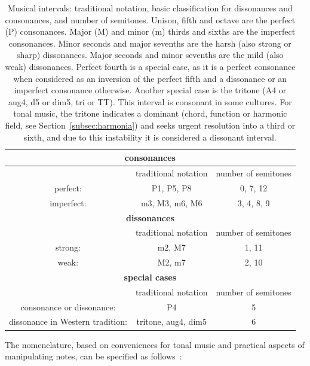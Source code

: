 \documentclass[format=acmsmall, review=false, screen=true]{acmart}
\begin{document}
\begin{table}[htp!]
\centering
    \caption{Musical intervals: traditional notation, basic classification for dissonances and consonances, and number of semitones. Unison, fifth and octave are the perfect (P) consonances. Major (M) and minor (m) thirds and sixths are the imperfect consonances. Minor seconds and major sevenths are the harsh (also strong or sharp) dissonances. Major seconds and minor sevenths are the mild (also weak) dissonances. Perfect fourth is a special case, as it is a perfect consonance when considered as an inversion of the perfect fifth and a dissonance or an imperfect consonance otherwise. Another special case is the tritone (A4 or aug4, d5 or dim5, tri or TT). This interval is consonant in some cultures.
	For tonal music, the tritone indicates a dominant (chord, function or harmonic field, see Section~\ref{subsec:harmonia}) and seeks urgent resolution into a third or sixth, and due to this instability it is considered a dissonant interval.}
\begin{tabular}{ c | c | c }\hline
    \multicolumn{3}{c}{\bf consonances}  \\\hline
   & traditional notation & number of semitones \\
   perfect: & P1, P5, P8 & 0, 7, 12 \\
 imperfect: & m3, M3, m6, M6 & 3, 4, 8, 9 \\\hline\hline
    \multicolumn{3}{c}{\bf dissonances} \\\hline
 & traditional notation & number of semitones \\
 strong: & m2, M7 & 1, 11 \\
 weak: & M2, m7 & 2, 10 \\\hline\hline
    \multicolumn{3}{c}{\bf special cases} \\\hline
 & traditional notation & number of semitones \\
 consonance or dissonance: & P4 & 5 \\
 dissonance in Western tradition: & tritone, aug4, dim5 & 6 \\\hline
\end{tabular}\label{eq:intervalos}
\end{table}

The nomenclature, based on conveniences for tonal music and practical aspects of manipulating notes, can be specified
as follows~\cite{Roederer,Wisnick}:
\end{document}
